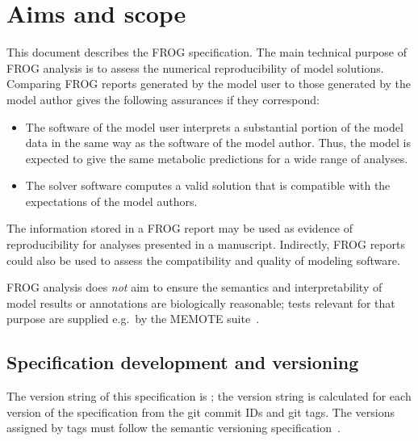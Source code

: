 
\section{Aims and scope}

This document describes the FROG specification. The main technical purpose of FROG analysis is to assess the numerical reproducibility of model solutions. Comparing FROG reports generated by the model user to those generated by the model author gives the following assurances if they correspond:
\begin{itemize}
\item The software of the model user interprets a substantial portion of the model data in the same way as the software of the model author. Thus, the model is expected to give the same metabolic predictions for a wide range of analyses.
\item The solver software computes a valid solution that is compatible with the expectations of the model authors.
\end{itemize}

The information stored in a FROG report may be used as evidence of reproducibility for analyses presented in a manuscript. Indirectly, FROG reports could also be used to assess the compatibility and quality of modeling software.

FROG analysis does \emph{not} aim to ensure the semantics and interpretability of model results or annotations are biologically reasonable; tests relevant for that purpose are supplied e.g.~by the MEMOTE suite~\cite{lieven2020memote}.

\subsection{Specification development and versioning}

The version string of this specification is \texttt{\frogspecversion}; the version string is calculated for each version of the specification from the git commit IDs and git tags. The versions assigned by tags must follow the semantic versioning specification~\cite{semver}.

